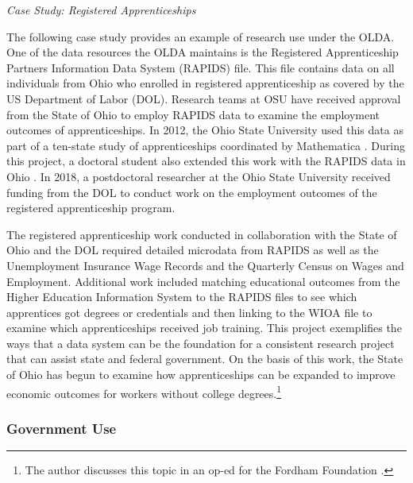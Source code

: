 \emph{Case Study: Registered Apprenticeships}

The following case study provides an example of research use under the OLDA. One of the data resources the OLDA maintains is the Registered Apprenticeship Partners Information Data System (RAPIDS) file. This file contains data on all individuals from Ohio who enrolled in registered apprenticeship as covered by the US Department of Labor (DOL). Research teams at OSU have received approval from the State of Ohio to employ RAPIDS data to examine the employment outcomes of apprenticeships. In 2012, the Ohio State University used this data as part of a ten-state study of apprenticeships coordinated by Mathematica \citep{reed2012}. During this project, a doctoral student also extended this work with the RAPIDS data in Ohio \citep{hsu2013}. In 2018, a postdoctoral researcher at the Ohio State University received funding from the DOL to conduct work on the employment outcomes of the registered apprenticeship program.

The registered apprenticeship work conducted in collaboration with the State of Ohio and the DOL required detailed microdata from RAPIDS as well as the Unemployment Insurance Wage Records and the Quarterly Census on Wages and Employment. Additional work included matching educational outcomes from the Higher Education Information System to the RAPIDS files to see which apprentices got degrees or credentials and then linking to the WIOA file to examine which apprenticeships received job training. This project exemplifies the ways that a data system can be the foundation for a consistent research project that can assist state and federal government. On the basis of this work, the State of Ohio has begun to examine how apprenticeships can be expanded to improve economic outcomes for workers without college degrees.\footnote{The author discusses this topic in an op-ed for the Fordham Foundation \citep{hawley2017a}.}



\hypertarget{government-use}{%
\subsubsection*{Government Use}\label{government-use}}

